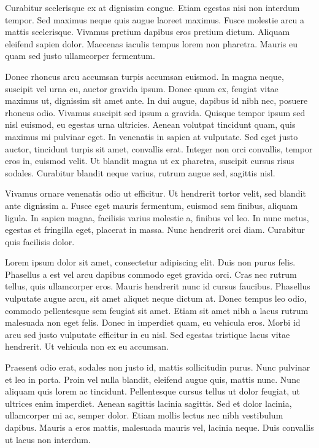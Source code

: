\documentclass[12pt,a4paper]{article}%
\begin{document}
%
\begin{justify}%
%
\end{justify}%
%
Curabitur scelerisque ex at dignissim congue. Etiam egestas nisi non interdum tempor. Sed maximus neque quis augue laoreet maximus. Fusce molestie arcu a mattis scelerisque. Vivamus pretium dapibus eros pretium dictum. Aliquam eleifend sapien dolor. Maecenas iaculis tempus lorem non pharetra. Mauris eu quam sed justo ullamcorper fermentum.%
\begin{justify}%
Donec rhoncus arcu accumsan turpis accumsan euismod. In magna neque, suscipit vel urna eu, auctor gravida ipsum. Donec quam ex, feugiat vitae maximus ut, dignissim sit amet ante. In dui augue, dapibus id nibh nec, posuere rhoncus odio. Vivamus suscipit sed ipsum a gravida. Quisque tempor ipsum sed nisl euismod, eu egestas urna ultricies. Aenean volutpat tincidunt quam, quis maximus mi pulvinar eget. In venenatis in sapien at vulputate. Sed eget justo auctor, tincidunt turpis sit amet, convallis erat. Integer non orci convallis, tempor eros in, euismod velit. Ut blandit magna ut ex pharetra, suscipit cursus risus sodales. Curabitur blandit neque varius, rutrum augue sed, sagittis nisl.%
\end{justify}%
\begin{justify}%
Vivamus ornare venenatis odio ut efficitur. Ut hendrerit tortor velit, sed blandit ante dignissim a. Fusce eget mauris fermentum, euismod sem finibus, aliquam ligula. In sapien magna, facilisis varius molestie a, finibus vel leo. In nunc metus, egestas et fringilla eget, placerat in massa. Nunc hendrerit orci diam. Curabitur quis facilisis dolor.%
\end{justify}%
\begin{justify}%
Lorem ipsum dolor sit amet, consectetur adipiscing elit. Duis non purus felis. Phasellus a est vel arcu dapibus commodo eget gravida orci. Cras nec rutrum tellus, quis ullamcorper eros. Mauris hendrerit nunc id cursus faucibus. Phasellus vulputate augue arcu, sit amet aliquet neque dictum at. Donec tempus leo odio, commodo pellentesque sem feugiat sit amet. Etiam sit amet nibh a lacus rutrum malesuada non eget felis. Donec in imperdiet quam, eu vehicula eros. Morbi id arcu sed justo vulputate efficitur in eu nisl. Sed egestas tristique lacus vitae hendrerit. Ut vehicula non ex eu accumsan.%
\end{justify}%
\begin{justify}%
Praesent odio erat, sodales non justo id, mattis sollicitudin purus. Nunc pulvinar et leo in porta. Proin vel nulla blandit, eleifend augue quis, mattis nunc. Nunc aliquam quis lorem ac tincidunt. Pellentesque cursus tellus ut dolor feugiat, ut ultrices enim imperdiet. Aenean sagittis lacinia sagittis. Sed et dolor lacinia, ullamcorper mi ac, semper dolor. Etiam mollis lectus nec nibh vestibulum dapibus. Mauris a eros mattis, malesuada mauris vel, lacinia neque. Duis convallis ut lacus non interdum.%
\end{justify}%
\end{document}
